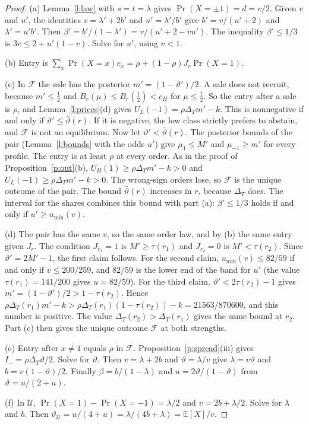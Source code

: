 \documentclass[12pt]{article}
\theoremstyle{definition}
\newcommand{\E}{\mathbb E}
\newcommand{\cH}{c_H}
\begin{document}
\begin{proof}
(a) Lemma~\ref{l:law} with $s=t=\lambda$ gives $\Pr(X=\pm1)=d=v/2$.
Given $v$ and $u'$, the identities $v=\lambda'+2b'$ and $u'=\lambda'/b'$ give $b'=v/(u'+2)$ and $\lambda'=u'b'$.
Then $\beta'=b'/(1-\lambda')=v/(u'+2-vu')$.
The inequality $\beta'\le1/3$ is $3v\le 2+u'(1-v)$.
Solve for $u'$, using $v<1$.

(b) Entry is $\sum_x\Pr(X=x)e_x=\rho+(1-\rho)J_r\Pr(X=1)$.

(c) In $\mathcal F$ the sale has the posterior $m'=(1-\vartheta')/2$.
A sale does not recruit, because $m'\le\tfrac12$ and $B_r(\mu)\le B_r(\tfrac12)<\cH$ for $\mu\le\tfrac12$.
So the entry after a sale is $\rho$, and Lemma~\ref{l:prices}(d) gives $U_L(-1)=\rho\Delta_T m'-k$.
This is nonnegative if and only if $\vartheta'\le\bar\vartheta(r)$.
If it is negative, the low class strictly prefers to abstain, and $\mathcal F$ is not an equilibrium.
Now let $\vartheta'<\bar\vartheta(r)$.
The posterior bounds of the pair (Lemma~\ref{l:bounds} with the odds $u'$) give $\mu_1\le M'$ and $\mu_{-1}\ge m'$ for every profile.
The entry is at least $\rho$ at every order.
As in the proof of Proposition~\ref{p:out}(b), $U_H(1)\ge\rho\Delta_T m'-k>0$ and $U_L(-1)\ge\rho\Delta_T m'-k>0$.
The wrong-sign orders lose, so $\mathcal F$ is the unique outcome of the pair.
The bound $\bar\vartheta(r)$ increases in $r$, because $\Delta_T$ does.
The interval for the shares combines this bound with part (a): $\beta'\le1/3$ holds if and only if $u'\ge u_{\min}(v)$.

(d) The pair has the same $v$, so the same order law, and by (b) the same entry given $J_r$.
The condition $J_{r_1}=1$ is $M'\ge\tau(r_1)$ and $J_{r_2}=0$ is $M'<\tau(r_2)$.
Since $\vartheta'=2M'-1$, the first claim follows.
For the second claim, $u_{\min}(v)\le 82/59$ if and only if $v\le 200/259$, and $82/59$ is the lower end of the band for $u'$ (the value $\tau(r_1)=141/200$ gives $u=82/59$).
For the third claim, $\vartheta'<2\tau(r_2)-1$ gives $m'=(1-\vartheta')/2>1-\tau(r_2)$.
Hence $\rho\Delta_T(r_1)m'-k>\rho\Delta_T(r_1)(1-\tau(r_2))-k=21563/870600$, and this number is positive.
The value $\Delta_T(r_2)>\Delta_T(r_1)$ gives the same bound at $r_2$.
Part (c) then gives the unique outcome $\mathcal F$ at both strengths.

(e) Entry after $x\ne1$ equals $\rho$ in $\mathcal F$.
Proposition~\ref{p:spread}(iii) gives $I_-=\rho\Delta_T\vartheta/2$.
Solve for $\vartheta$.
Then $v=\lambda+2b$ and $\vartheta=\lambda/v$ give $\lambda=v\vartheta$ and $b=v(1-\vartheta)/2$.
Finally $\beta=b/(1-\lambda)$ and $u=2\vartheta/(1-\vartheta)$ from $\vartheta=u/(2+u)$.

(f) In $\mathcal U$, $\Pr(X=1)-\Pr(X=-1)=\lambda/2$ and $v=2b+\lambda/2$.
Solve for $\lambda$ and $b$.
Then $\vartheta_{\mathcal U}=u/(4+u)=\lambda/(4b+\lambda)=\E[X]/v$.
\end{proof}
\end{document}
